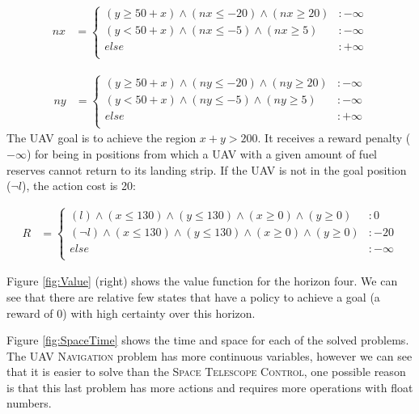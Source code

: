 {\footnotesize
\begin{align*}
nx & = \begin{cases}
(y \geq 50 + x) \wedge (nx \leq -20) \wedge (nx \geq 20) &:-\infty\\
(y < 50 + x) \wedge (nx \leq -5) \wedge (nx \geq 5) &:-\infty\\
else &: +\infty\\
\end{cases}
\end{align*}}

{\footnotesize
\begin{align*}
ny & = \begin{cases}
(y \geq 50 + x) \wedge (ny \leq -20) \wedge (ny \geq 20) &:-\infty\\
(y < 50 + x) \wedge (ny \leq -5) \wedge (ny \geq 5) &:-\infty\\
else &: +\infty\\
\end{cases}
\end{align*}}
The UAV goal is to achieve the region $x+y > 200$. It receives a reward penalty ($-\infty$) for being in positions  from which a UAV with a given amount of fuel reserves cannot return to its landing strip. If the UAV is not in the goal position ($\neg l$), the action cost is 20:

{\footnotesize
\begin{align*}
R & = \begin{cases}
(l) \wedge (x \leq 130) \wedge (y \leq 130) \wedge (x \geq 0) \wedge (y \geq 0) &:0\\
(\neg l) \wedge (x \leq 130) \wedge (y \leq 130) \wedge (x \geq 0) \wedge (y \geq 0) &:-20\\
else &: -\infty\\
\end{cases}
\end{align*}}

Figure \ref{fig:Value} (right) shows the value function for the horizon four. We can see that there are relative few states that have a policy to achieve a goal (a reward of 0) with high certainty over this horizon.


Figure \ref{fig:SpaceTime} shows the time and space for each of the solved problems. The \textsc{UAV Navigation} problem has more continuous variables, however we can see that it is easier to solve than the \textsc{Space Telescope Control}, one possible reason is that this last problem has more actions and requires more operations with float numbers.
